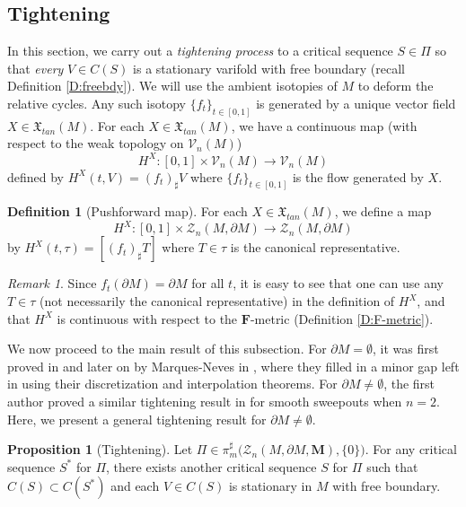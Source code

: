 \documentclass[10pt]{amsart}
\theoremstyle{definition}
\newtheorem{definition}[theorem]{Definition}
\newtheorem{proposition}[theorem]{Proposition}
\theoremstyle{remark}
\newtheorem{remark}[theorem]{Remark}
\numberwithin{equation}{section}
\newcommand{\V}{\mathcal{V}}
\newcommand{\Z}{\mathcal{Z}}
\newcommand{\M}{\mathbf{M}}
\newcommand{\mF}{\mathbf{F}}
\begin{document}
\subsection{Tightening}
\label{SS:tightening} 


In this section, we carry out a \emph{tightening process} to a critical sequence $S \in \Pi$ so that \emph{every} $V \in C(S)$ is a stationary varifold with free boundary (recall Definition \ref{D:freebdy}). We will use the ambient isotopies of $M$ to deform the relative cycles. Any such isotopy $\{f_t\}_{t \in [0,1]}$ is generated by a unique vector field $X \in \mathfrak{X}_{tan}(M)$. For each $X \in \mathfrak{X}_{tan}(M)$, we have a continuous map (with respect to the weak topology on $\V_n(M)$)
\[  H^X: [0, 1] \times \V_n(M) \rightarrow \V_n(M) \]
defined by $H^X(t, V)= (f_t)_\sharp V$ where $\{f_t\}_{t \in [0,1]}$ is the flow generated by $X$.

\begin{definition}[Pushforward map]
\label{D:pushforward}
For each $X \in \mathfrak{X}_{tan}(M)$, we define a map
\[ H^X : [0,1] \times \Z_n(M,\partial M) \to \Z_n(M,\partial M) \]
by $H^X(t,\tau)=[(f_t)_\sharp T]$ where $T \in \tau$ is the canonical representative.
\end{definition}

\begin{remark}
Since $f_t(\partial M)=\partial M$ for all $t$, it is easy to see that one can use any $T \in \tau$ (not necessarily the canonical representative) in the definition of $H^X$, and that $H^X$ is continuous with respect to the $\mF$-metric (Definition \ref{D:F-metric}).
\end{remark}

We now proceed to the main result of this subsection. For $\partial M=\emptyset$, it was first proved in \cite[Theorem 4.3]{Pitts} and later on by Marques-Neves in \cite[Proposition 8.5]{Marques-Neves14}, where they filled in a minor gap left in \cite{Pitts} using their discretization and interpolation theorems. For $\partial M\neq\emptyset$, the first author proved a similar tightening result in \cite[Proposition 5.1]{Li15} for smooth sweepouts when $n=2$. Here, we present a general tightening result for $\partial M \neq \emptyset$. %

\begin{proposition}[Tightening]
\label{P:tightening}
Let $\Pi \in \pi^{\sharp}_{m}\big(\Z_{n}(M, \partial M, \M), \{0\}\big)$. For any critical sequence $S^*$ for $\Pi$, there exists another critical sequence $S$ for $\Pi$ such that $C(S) \subset C(S^*)$ and each $V\in C(S)$ is stationary in $M$ with free boundary.
\end{proposition}
\end{document}
